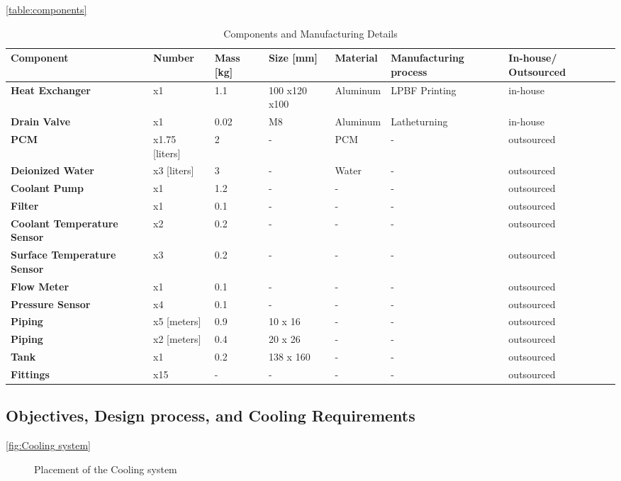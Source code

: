 \autoref{table:components}
\begin{table} [H]
\centering
\caption{Components and Manufacturing Details}
\label{table:components}
\begin{adjustbox}{width=\textwidth,center}
\begin{tabular}{|>{\bfseries}m{2.9cm}|m{2.4cm}|m{1.7cm}|m{2.5cm}|m{2.2cm}|m{2.6cm}|m{2.2cm}|}
\hline
Component & Number & Mass [kg] & Size [mm] & Material & Manufacturing process & In-house/ Outsourced \\
\hline
Heat Exchanger & x1 & 1.1 & 100 x120 x100 & Aluminum & LPBF Printing & in-house \\
Drain Valve & x1 & 0.02 & M8 & Aluminum & Latheturning & in-house \\
PCM & x1.75 [liters] & 2 & - & PCM & - & outsourced \\
Deionized Water & x3 [liters] & 3 & - & Water & - & outsourced \\
Coolant Pump & x1 &1.2 & - & - & - & outsourced \\
Filter &x1 & 0.1 & - & - & - &outsourced \\
Coolant Temperature Sensor & x2 & 0.2 & - & - & - & outsourced \\
Surface Temperature Sensor & x3 & 0.2 & - & - & - & outsourced \\
Flow Meter & x1 & 0.1 & - & - & - & outsourced \\
Pressure Sensor & x4 & 0.1 & - & - & - & outsourced \\
Piping & x5 [meters] & 0.9 &  10 x 16& - & - & outsourced \\
Piping & x2 [meters] & 0.4 & 20 x 26 & - & - & outsourced \\
Tank & x1 & 0.2 & 138 x 160 & - & - & outsourced \\

Fittings & x15 & - & - & - & - & outsourced \\
\hline
\end{tabular}
\end{adjustbox}
\end{table}


\subsection{Objectives, Design process, and Cooling Requirements}
\autoref{fig:Cooling system}
\begin{figure}[ht]
  \centering
  \caption{Placement of the Cooling system}
  \label{fig:Cooling system}
\end{figure}



